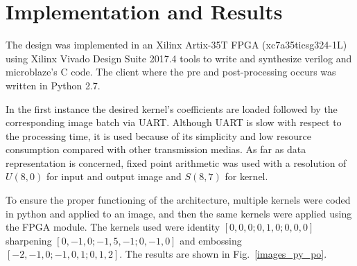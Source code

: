 \documentclass[conference,compsoc]{IEEEtran}
\begin{document}

\section{Implementation and Results}\label{sec:implementation}

The design was implemented in an Xilinx Artix-35T FPGA (xc7a35ticsg324-1L) using Xilinx
Vivado Design Suite 2017.4 tools to write and synthesize verilog and 
microblaze's C code. The client where the pre and post-processing occurs was
written in Python 2.7.

In the first instance the desired kernel's coefficients are loaded followed by
the corresponding image batch via UART\@. Although UART is slow with respect to
the processing time, it is used because of its simplicity and low resource
consumption compared with other transmission medias.
As far as data representation is concerned, fixed point arithmetic was used with
a resolution of $U(8,0)$ for input and output image and $S(8,7)$ for kernel.

To ensure the proper functioning of the architecture, multiple kernels were
coded in python and applied to an image, and then the same kernels were applied using
the FPGA module. The kernels used were identity $[0, 0, 0; 0, 1, 0; 0, 0, 0]$
sharpening $[0, -1, 0; -1, 5, -1; 0, -1, 0]$ and embossing $[-2, -1, 0; -1, 0,
1; 0, 1, 2]$. The results are shown in Fig.~\ref{images_py_po}.
\end{document}
